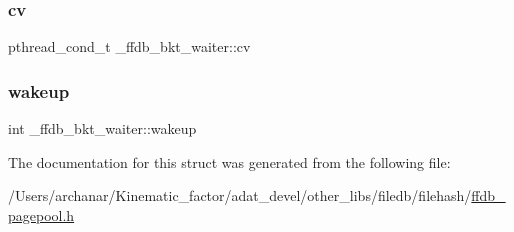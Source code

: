 \subsubsection{\texorpdfstring{cv}{cv}}
{\footnotesize\ttfamily pthread\+\_\+cond\+\_\+t \+\_\+ffdb\+\_\+bkt\+\_\+waiter\+::cv}

\mbox{\label{struct__ffdb__bkt__waiter_a9677f7593396ca503610bd92c4430835}} 
\subsubsection{\texorpdfstring{wakeup}{wakeup}}
{\footnotesize\ttfamily int \+\_\+ffdb\+\_\+bkt\+\_\+waiter\+::wakeup}



The documentation for this struct was generated from the following file\+:\begin{DoxyCompactItemize}
\item 
/\+Users/archanar/\+Kinematic\+\_\+factor/adat\+\_\+devel/other\+\_\+libs/filedb/filehash/\mbox{\hyperlink{ffdb__pagepool_8h}{ffdb\+\_\+pagepool.\+h}}\end{DoxyCompactItemize}
